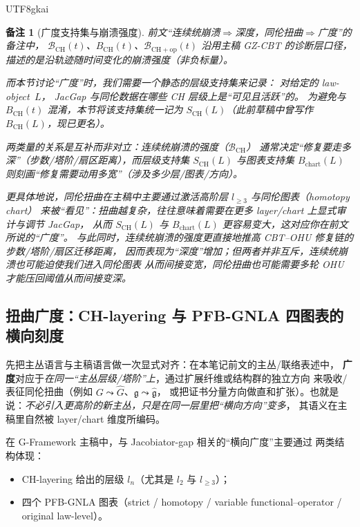 \documentclass[12pt]{article}
\newtheorem{remark}{备注}[section]
\begin{document}
\begin{CJK*}{UTF8}{gkai}
\begin{remark}[广度支持集与崩溃强度]
前文“连续统崩溃$\Rightarrow$深度，同伦扭曲$\Rightarrow$广度”的备注中，
$\mathcal{B}_{\mathrm{CH}}(t)$、$B_{\mathrm{CH}}(t)$、$\mathcal{B}_{\mathrm{CH+op}}(t)$
沿用主稿 GZ-CBT 的诊断层口径，描述的是\emph{沿轨迹随时间变化的崩溃强度}（非负标量）。

而本节讨论“广度”时，我们需要一个\emph{静态的层级支持集}来记录：
对给定的 law-object~$L$，
JacGap 与同伦数据在\emph{哪些 CH 层级}上是“可见且活跃”的。
为避免与 $B_{\mathrm{CH}}(t)$ 混淆，本节将该支持集统一记为
$S_{\mathrm{CH}}(L)$（此前草稿中曾写作 $B_{\mathrm{CH}}(L)$，现已更名）。

两类量的关系是互补而非对立：连续统崩溃的强度（$\mathcal{B}_{\mathrm{CH}}$）
通常决定“修复要走多深”（步数/塔阶/扇区距离），而层级支持集 $S_{\mathrm{CH}}(L)$
与图表支持集 $B_{\mathrm{chart}}(L)$ 则刻画“修复需要动用多宽”（涉及多少层/图表/方向）。

更具体地说，同伦扭曲在主稿中主要通过\emph{激活高阶层 $l_{\ge3}$ 与同伦图表（homotopy chart）}
来被“看见”：扭曲越复杂，往往意味着需要在更多 layer/chart 上显式审计与调节 JacGap，
从而 $S_{\mathrm{CH}}(L)$ 与 $B_{\mathrm{chart}}(L)$ 更容易变大，这对应你在前文所说的“广度”。
与此同时，连续统崩溃的强度更直接地推高 CBT--OHU 修复链的步数/塔阶/扇区迁移距离，
因而表现为“深度”增加；但两者并非互斥，连续统崩溃也可能迫使我们进入同伦图表
从而间接变宽，同伦扭曲也可能需要多轮 OHU 才能压回阈值从而间接变深。
\end{remark}

\subsection{扭曲广度：CH-layering 与 PFB-GNLA 四图表的横向刻度}

先把主丛语言与主稿语言做一次显式对齐：在本笔记前文的主丛/联络表述中，
\textbf{广度}对应于\emph{在同一“主丛层级/塔阶”上}，通过扩展纤维或结构群的独立方向
来吸收/表征同伦扭曲（例如 $G\leadsto \widehat G$、$\mathfrak g\leadsto\widehat{\mathfrak g}$，
或把证书分量方向做直和扩张）。也就是说：\emph{不必引入更高阶的新主丛，只是在同一层里把“横向方向”变多}，
其语义在主稿里自然被 layer/chart 维度所编码。

在 G-Framework 主稿中，与 Jacobiator-gap 相关的“横向广度”主要通过
两类结构体现：
\begin{itemize}
  \item CH-layering 给出的层级 $l_n$（尤其是 $l_2$ 与 $l_{\ge3}$）；
  \item 四个 PFB-GNLA 图表（strict / homotopy /
        variable functional--operator / original law-level）。
\end{itemize}


\end{CJK*}
\end{document}
